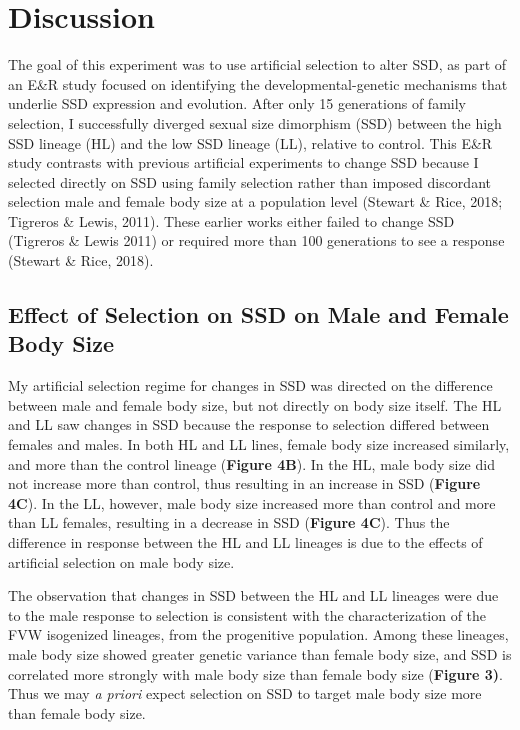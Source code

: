 \documentclass[12pt,reqno,oneside]{report}
\begin{document}
\section{Discussion}

The goal of this experiment was to use artificial selection to alter SSD, as part of an E\&R study focused on identifying the developmental-genetic mechanisms that underlie SSD expression and evolution.  After only 15 generations of family selection, I successfully diverged sexual size dimorphism (SSD) between the high SSD lineage (HL) and the low SSD lineage (LL), relative to control. This E\&R study contrasts with previous artificial experiments to change SSD because I selected directly on SSD using family selection rather than imposed discordant selection male and female body size at a population level (Stewart \& Rice, 2018; Tigreros \& Lewis, 2011). These earlier works either failed to change SSD (Tigreros \& Lewis 2011) or required more than 100 generations to see a response (Stewart \& Rice, 2018).

\subsection{Effect of Selection on SSD on Male and Female Body Size}

My artificial selection regime for changes in SSD was directed on the difference between male and female body size, but not directly on body size itself. The HL and LL saw changes in SSD because the response to selection differed between females and males. In both HL and LL lines, female body size increased similarly, and more than the control lineage (\textbf{Figure 4B}). In the HL, male body size did not increase more than control, thus resulting in an increase in SSD (\textbf{Figure 4C}). In the LL, however, male body size increased more than control and more than LL females, resulting in a decrease in SSD (\textbf{Figure 4C}). Thus the difference in response between the HL and LL lineages is due to the effects of artificial selection on male body size. 

The observation that changes in SSD between the HL and LL lineages were due to the male response to selection is consistent with the characterization of the FVW isogenized lineages, from the progenitive population. Among these lineages, male body size showed greater genetic variance than female body size, and SSD is correlated more strongly with male body size than female body size (\textbf{Figure 3)}. Thus we may \textit{a priori} expect selection on SSD to target male body size more than female body size. 
\end{document}

